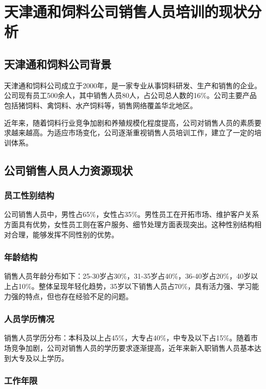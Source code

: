 \section{天津通和饲料公司销售人员培训的现状分析}

\subsection{天津通和饲料公司背景}

天津通和饲料公司成立于2000年，是一家专业从事饲料研发、生产和销售的企业。公司现有员工500余人，其中销售人员80人，占公司总人数的16\%。公司主要产品包括猪饲料、禽饲料、水产饲料等，销售网络覆盖华北地区。

近年来，随着饲料行业竞争加剧和养殖规模化程度提高，公司对销售人员的素质要求越来越高。为适应市场变化，公司逐渐重视销售人员培训工作，建立了一定的培训体系。

\subsection{公司销售人员人力资源现状}

\subsubsection{员工性别结构}

公司销售人员中，男性占65\%，女性占35\%。男性员工在开拓市场、维护客户关系方面具有优势，女性员工则在客户服务、细节处理方面表现突出。这种性别结构相对合理，能够发挥不同性别的优势。

\subsubsection{年龄结构}

销售人员年龄分布如下：25-30岁占30\%，31-35岁占40\%，36-40岁占20\%，40岁以上占10\%。整体呈现年轻化趋势，35岁以下销售人员占70\%，具有活力强、学习能力强的特点，但也存在经验不足的问题。

\subsubsection{人员学历情况}

销售人员学历分布：本科及以上占45\%，大专占40\%，中专及以下占15\%。随着市场竞争加剧，公司对销售人员的学历要求逐渐提高，近年来新入职销售人员基本达到大专及以上学历。

\subsubsection{工作年限}

